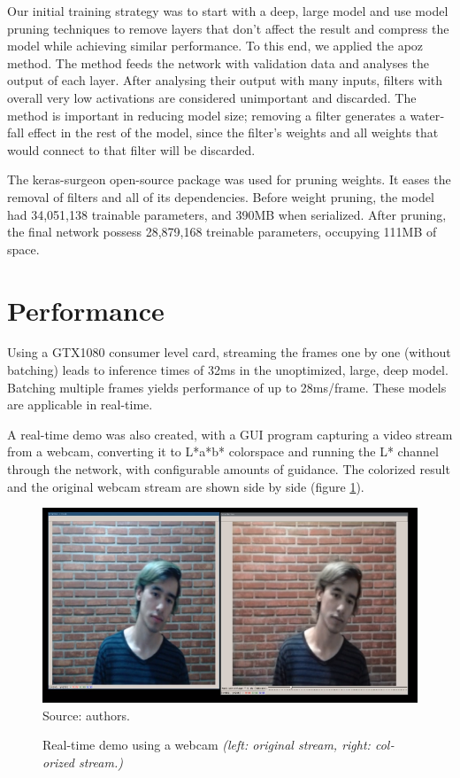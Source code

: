 \documentclass[12pt,openright,oneside,a4paper,english, brazilian]{abntex2}
\begin{document}
\begin{otherlanguage}{english}
Our initial training strategy was to start with a deep, large model and use model pruning techniques to remove layers that don't affect the result and compress the model while achieving similar performance. To this end, we applied the \acrfull{apoz} method. The method feeds the network with validation data and analyses the output of each layer. After analysing their output with many inputs, filters with overall very low activations are considered unimportant and discarded. The method is important in reducing model size; removing a filter generates a waterfall effect in the rest of the model, since the filter's weights and all weights that would connect to that filter will be discarded.

The keras-surgeon \cite{keras_surgeon} open-source package was used for pruning weights. It eases the removal of filters and all of its dependencies. Before weight pruning, the model had 34,051,138 trainable parameters, and 390MB when serialized. After pruning, the final network possess 28,879,168 treinable parameters, occupying 111MB of space.

\section{Performance}
Using a GTX1080 consumer level card, streaming the frames one by one (without batching) leads to inference times of 32ms in the unoptimized, large, deep model. Batching multiple frames yields performance of up to 28ms/frame. These models are applicable in real-time.

A real-time demo was also created, with a GUI program capturing a video stream from a webcam, converting it to L*a*b* colorspace and running the L* channel through the network, with configurable amounts of guidance. The colorized result and the original webcam stream are shown side by side (figure \ref{fig:webcam}).

\begin{figure}[H]
\centering
\caption{Real-time demo using a webcam \textit{(left: original stream, right: colorized stream.)}}
\includegraphics[width=\textwidth+20pt]{webcam}
Source: authors.
\label{fig:webcam}
\end{figure}


\end{otherlanguage}
\end{document}
